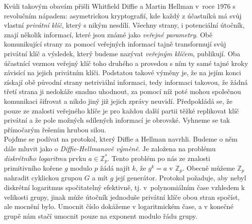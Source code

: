 \documentclass [12pt]{report}
\begin{document}
Kvůli takovým obavám přišli Whitfield Diffie a Martin Hellman v~roce $1976$ s revolučním nápadem: asymetrickou kryptografií, kde každý z účastníků má svůj vlastní \textit{privátní klíč}, který s nikým nesdílí. Všechny strany, i potenciální útočník, znají několik informací, které jsou známé jako \textit{veřejné parametry}. Obě komunikující strany za pomocí veřejných informací tajně transformují svůj privátní klíč a výsledek, který budeme nazývat \textit{veřejným klíčem}, publikují. Oba účastnící vezmou veřejný klíč toho druhého a provedou s ním ty samé tajné kroky závisící na jejich privátním klíči. Podstatou takové výměny je, že na jejím konci získají obě původní strany netriviální informaci, tedy informaci takovou, že žádná třetí strana ji nedokáže snadno uhodnout, za pomocí níž poté mohou společnou komunikaci šifrovat a nikdo jiný již jejich zprávy neuvidí. Předpokládá se, že pouze ze znalosti veřejného klíče je pro každou další partii těžké replikovat klíč privátní a že pole možných sdílených informací je obrovské. Vyhneme se tak přímočarým řešením hrubou silou.\\

Pojďme se podívat na protokol, který Diffie a Hellman navrhli. Budeme o něm dále mluvit jako o \textit{Diffie-Hellmanově výměně}. Je založena na problému \textit{diskrétního logaritmu} prvku $a \in \mathbb{Z}_p^{*}$. Tento problém po nás ze znalosti primitivního kořene $g$ modulo $p$ žádá najít $k$, že $g^k = a$ v $\mathbb{Z}_p$. Obecně můžeme $\mathbb{Z}_p$ nahradit cyklickou grupou $G$ a mít $g$ její generátor. Protokol požaduje, aby nebyl diskrétní logaritmus spočitatelný efektivně, tj. v~polynomiálním čase vzhledem k velikosti grupy, jinak může útočník jednoduše privátní klíče obou stran spočíst, ale mocnění bylo. Umocnit číslo dokážeme v logaritmickém čase, a v konečné grupě nám stačí umocnit pouze na exponent modulo řádu grupy. \\
\end{document}
